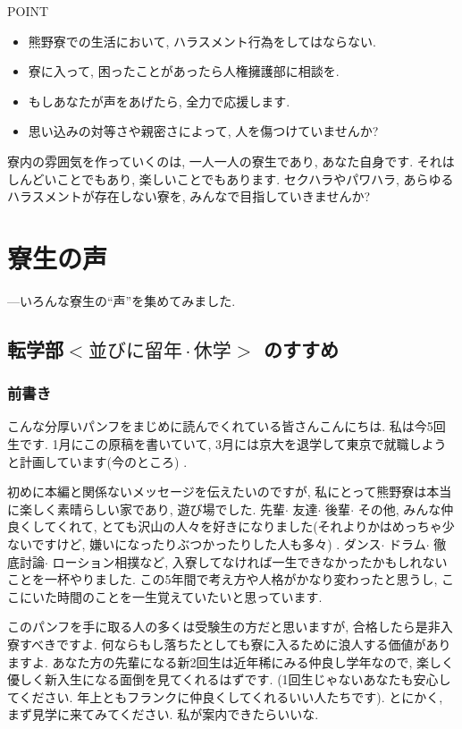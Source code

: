 \documentclass[10pt,b5jsbook,dvips,dvipdfmx,openany]{jsbook}
\theoremstyle{definition}
\begin{document}
\normalsize
		\begin{tcolorbox}
		POINT
		\begin{itemize}
		\item 熊野寮での生活において, ハラスメント行為をしてはならない.
		\item 寮に入って, 困ったことがあったら人権擁護部に相談を.
		\item もしあなたが声をあげたら, 全力で応援します.
		\item 思い込みの対等さや親密さによって, 人を傷つけていませんか?
		\end{itemize}
		\end{tcolorbox}

		寮内の雰囲気を作っていくのは, 一人一人の寮生であり, あなた自身です. それはしんどいことでもあり, 楽しいことでもあります. セクハラやパワハラ, あらゆるハラスメントが存在しない寮を, みんなで目指していきませんか?



\newpage

\chapter{寮生の声}

---いろんな寮生の``声''を集めてみました.

	\section{転学部$ < 並びに留年 \cdot 休学 > $ のすすめ}
		\subsection{前書き}
		こんな分厚いパンフをまじめに読んでくれている皆さんこんにちは. 私は今5回生です. 1月にこの原稿を書いていて, 3月には京大を退学して東京で就職しようと計画しています(今のところ) .

		初めに本編と関係ないメッセージを伝えたいのですが, 私にとって熊野寮は本当に楽しく素晴らしい家であり, 遊び場でした. 先輩$ \cdot $ 友達$ \cdot $ 後輩$ \cdot $ その他, みんな仲良くしてくれて, とても沢山の人々を好きになりました(それよりかはめっちゃ少ないですけど, 嫌いになったりぶつかったりした人も多々) . ダンス$ \cdot $ ドラム$ \cdot $ 徹底討論$ \cdot $ ローション相撲など, 入寮してなければ一生できなかったかもしれないことを一杯やりました. この5年間で考え方や人格がかなり変わったと思うし, ここにいた時間のことを一生覚えていたいと思っています.

		このパンフを手に取る人の多くは受験生の方だと思いますが, 合格したら是非入寮すべきですよ. 何ならもし落ちたとしても寮に入るために浪人する価値がありますよ. あなた方の先輩になる新2回生は近年稀にみる仲良し学年なので, 楽しく優しく新入生になる面倒を見てくれるはずです. (1回生じゃないあなたも安心してください. 年上ともフランクに仲良くしてくれるいい人たちです).  %
とにかく, まず見学に来てみてください. 私が案内できたらいいな.
\end{document}
